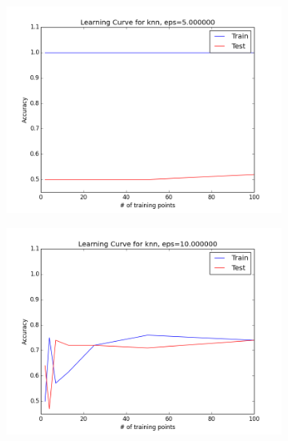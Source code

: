 \documentclass{article}
\begin{document}
	\begin{figure} [h!]
	\centering
		\begin{subfigure} [h!]{.4\textwidth}
		\includegraphics[scale = .45]{LC_eps5_000000.png}
		\end{subfigure}
		\hfill
		\begin{subfigure} [h!]{.4\textwidth}
		\includegraphics[scale = .45]{LC_eps10_000000.png}
		\end{subfigure}
		\\
		\begin{subfigure} [h!]{.4\textwidth}

\end{subfigure}
\end{figure}
\end{document}
